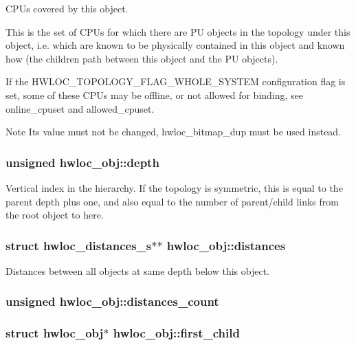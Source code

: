 CPUs covered by this object. 

This is the set of CPUs for which there are PU objects in the topology under this object, i.e. which are known to be physically contained in this object and known how (the children path between this object and the PU objects).

If the HWLOC\_\-TOPOLOGY\_\-FLAG\_\-WHOLE\_\-SYSTEM configuration flag is set, some of these CPUs may be offline, or not allowed for binding, see online\_\-cpuset and allowed\_\-cpuset.

\begin{DoxyNote}{Note}
Its value must not be changed, hwloc\_\-bitmap\_\-dup must be used instead. 
\end{DoxyNote}
\hypertarget{a00016_a9d82690370275d42d652eccdea5d3ee5}{
\subsubsection[{depth}]{\setlength{\rightskip}{0pt plus 5cm}unsigned {\bf hwloc\_\-obj::depth}}}
\label{a00016_a9d82690370275d42d652eccdea5d3ee5}


Vertical index in the hierarchy. If the topology is symmetric, this is equal to the parent depth plus one, and also equal to the number of parent/child links from the root object to here. 

\hypertarget{a00016_a9a5dd75596edc48fe834f81988cdc0d6}{
\subsubsection[{distances}]{\setlength{\rightskip}{0pt plus 5cm}struct {\bf hwloc\_\-distances\_\-s}$\ast$$\ast$ {\bf hwloc\_\-obj::distances}}}
\label{a00016_a9a5dd75596edc48fe834f81988cdc0d6}


Distances between all objects at same depth below this object. 

\hypertarget{a00016_a8be6f63eca4da91000c832280db927b7}{
\subsubsection[{distances\_\-count}]{\setlength{\rightskip}{0pt plus 5cm}unsigned {\bf hwloc\_\-obj::distances\_\-count}}}
\label{a00016_a8be6f63eca4da91000c832280db927b7}
\hypertarget{a00016_af51d08a0a79dba517c06c5afedc8d2dc}{
\subsubsection[{first\_\-child}]{\setlength{\rightskip}{0pt plus 5cm}struct {\bf hwloc\_\-obj}$\ast$ {\bf hwloc\_\-obj::first\_\-child}}}
\label{a00016_af51d08a0a79dba517c06c5afedc8d2dc}


